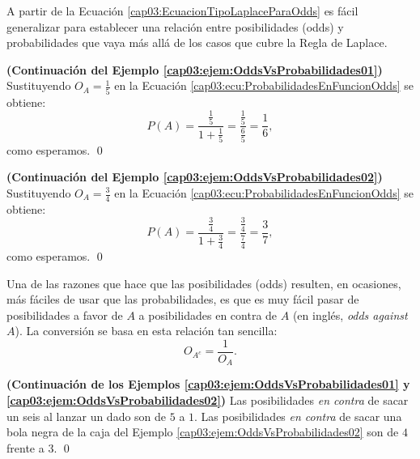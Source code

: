 A partir de la Ecuación \ref{cap03:EcuacionTipoLaplaceParaOdds} es fácil generalizar para establecer una relación entre posibilidades (odds) y probabilidades que vaya más allá de los casos que cubre la Regla de Laplace.
    \begin{center}
    \end{center}
\begin{ejemplo}\label{cap03:ejem:OddsVsProbabilidades03}{\bf (Continuación del Ejemplo \ref{cap03:ejem:OddsVsProbabilidades01})}
Sustituyendo $O_A=\frac{1}{5}$ en la Ecuación \ref{cap03:ecu:ProbabilidadesEnFuncionOdds} se obtiene:
\[P(A)=\dfrac{\frac{1}{5}}{1+\frac{1}{5}}=\dfrac{\frac{1}{5}}{\frac{6}{5}}=\frac{1}{6}, \]
como esperamos.
\qed
\end{ejemplo}
\begin{ejemplo}\label{cap03:ejem:OddsVsProbabilidades04}{\bf (Continuación del Ejemplo \ref{cap03:ejem:OddsVsProbabilidades02})}
Sustituyendo $O_A=\frac{3}{4}$ en la Ecuación \ref{cap03:ecu:ProbabilidadesEnFuncionOdds} se obtiene:
\[P(A)=\dfrac{\frac{3}{4}}{1+\frac{3}{4}}=\dfrac{\frac{3}{4}}{\frac{7}{4}}=\frac{3}{7}, \]
como esperamos.
\qed
\end{ejemplo}
Una de las razones que hace que las posibilidades (odds) resulten, en ocasiones, más fáciles de usar que las probabilidades, es que es muy fácil pasar de posibilidades a favor de $A$ a {\sf posibilidades en contra} de $A$ (en inglés, {\em odds against} $A$). La conversión se basa en esta relación tan sencilla:
\begin{equation}
    O_{A^c}=\dfrac{1}{O_{A}}.
\end{equation}
\begin{ejemplo}
\label{cap03:ejem:OddsVsProbabilidades03}{\bf (Continuación de los Ejemplos \ref{cap03:ejem:OddsVsProbabilidades01} y \ref{cap03:ejem:OddsVsProbabilidades02})}
Las posibilidades {\em en contra} de sacar un seis al lanzar un dado son de $5$ a $1$. Las posibilidades {\em en contra} de sacar una bola negra de la caja del Ejemplo \ref{cap03:ejem:OddsVsProbabilidades02} son de $4$ frente a $3$.
\qed
\end{ejemplo}

